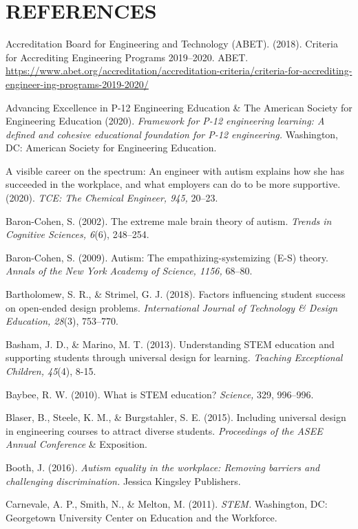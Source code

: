 \documentclass[11.5pt]{sig-alternate}
\begin{document}
\section*{\textbf{REFERENCES}}\par 

\leftskip 0.25in
\parindent -0.25in 
Accreditation Board for Engineering and Technology (ABET). (2018). Criteria for Accrediting Engineering Programs 2019–2020. ABET. \url{https://www.abet.org/accreditation/accreditation-criteria/criteria-for-accrediting-engineer-ing-programs-2019-2020/}

Advancing Excellence in P-12 Engineering Education \& The American Society for Engineering Education (2020). \textit{Framework for P-12 engineering learning: A defined and cohesive educational foundation for P-12 engineering.} Washington, DC: American Society for Engineering Education.

A visible career on the spectrum: An engineer with autism explains how she has succeeded in the workplace, and what employers can do to be more supportive. (2020). \textit{TCE: The Chemical Engineer, 945,} 20–23.

Baron-Cohen, S. (2002). The extreme male brain theory of autism. \textit{Trends in Cognitive Sciences, 6}(6), 248–254.

Baron-Cohen, S. (2009). Autism: The empathizing-systemizing (E-S) theory. \textit{Annals of the New York Academy of Science, 1156,} 68–80. 

Bartholomew, S. R., \& Strimel, G. J. (2018). Factors influencing student success on open-ended design problems. \textit{International Journal of Technology \& Design Education, 28}(3), 753–770. 

Basham, J. D., \& Marino, M. T. (2013). Understanding STEM education and supporting students through universal design for learning. \textit{Teaching Exceptional Children, 45}(4), 8-15.

Baybee, R. W. (2010). What is STEM education? \textit{Science,} 329, 996–996.

Blaser, B., Steele, K. M., \& Burgstahler, S. E. (2015). Including universal design in engineering courses to attract diverse students. \textit{Proceedings of the ASEE Annual Conference} \& Exposition.

Booth, J. (2016). \textit{Autism equality in the workplace: Removing barriers and challenging discrimination.} Jessica Kingsley Publishers.

Carnevale, A. P., Smith, N., \& Melton, M. (2011). \textit{STEM.} Washington, DC: Georgetown University Center on Education and the Workforce. 
\end{document}
